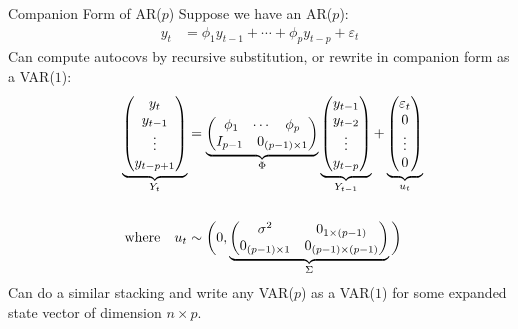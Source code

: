 \documentclass[aspectratio=169, handout]{beamer}
\begin{document}
{\scriptsize
\begin{frame}{Companion Form of AR($p$)}
Suppose we have an AR($p$):
\begin{align*}
  y_t &= \phi_1 y_{t-1} + \cdots + \phi_p y_{t-p} + \varepsilon_t
\end{align*}
Can compute autocovs by recursive substitution, or
rewrite in \alert{companion form} as a VAR($1$):
\begin{align*}
  \underbrace{%
  \begin{pmatrix}
    y_t \\ y_{t-1} \\ \vdots \\ y_{t-p+1}
  \end{pmatrix}
  }_{Y_t}
  &=
  \underbrace{%
  \begin{pmatrix}
    \begin{matrix}
      \phi_1 & \cdots & \phi_p
    \end{matrix}
    \\
    \begin{matrix}
      I_{p-1} & 0_{(p-1)\times 1}
    \end{matrix}
  \end{pmatrix}
  }_{\Phi}
  \underbrace{%
  \begin{pmatrix}
    y_{t-1} \\ y_{t-2} \\ \vdots \\ y_{t-p}
  \end{pmatrix}
  }_{Y_{t-1}}
  +
  \underbrace{%
  \begin{pmatrix}
    \varepsilon_{t} \\ 0 \\ \vdots \\ 0
  \end{pmatrix}
  }_{u_t}
  \\
  \\
  \qquad\text{where}\quad
  u_t &\sim
  \bigg(0,
  \underbrace{
  \begin{pmatrix}
    \sigma^2 & 0_{1\times (p-1)}\\
    0_{(p-1)\times 1} & 0_{(p-1)\times (p-1)}\\
  \end{pmatrix}
  }_{\Sigma}
  \bigg)
\end{align*}
\pause
Can do a similar stacking and write any VAR($p$) as a VAR($1$) for some
expanded state vector of dimension $n\times p$.
\end{frame}
}
\end{document}
